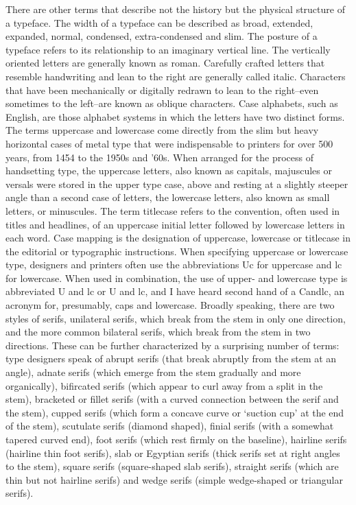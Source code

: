 \documentclass[12pt,a4paper,twocolumn]{book} %
\begin{document}
There are other terms that describe not the history but the physical structure of a typeface. The width of a typeface can be described as broad, extended, expanded, normal, condensed, extra-condensed and slim. The posture of a typeface refers to its relationship to an imaginary vertical line. The vertically oriented letters are generally known as roman. Carefully crafted letters that resemble handwriting and lean to the right are generally called italic. Characters that have been mechanically or digitally redrawn to lean to the right–even sometimes to the left–are known as oblique characters.
Case alphabets, such as English, are those alphabet systems in which the letters have two distinct forms. The terms uppercase and lowercase come directly from the slim but heavy horizontal cases of metal type that were indispensable to printers for over 500 years, from 1454 to the 1950s and ’60s. When arranged for the process of handsetting type, the uppercase letters, also known as capitals, majuscules or versals were stored in the upper type case, above and resting at a slightly steeper angle than a second case of letters, the lowercase letters, also known as small letters, or minuscules. The term titlecase refers to the convention, often used in titles and headlines, of an uppercase initial letter followed by lowercase letters in each word.
Case mapping is the designation of uppercase, lowercase or titlecase in the editorial or typographic instructions. When specifying uppercase or lowercase type, designers and printers often use the abbreviations Uc for uppercase and lc for lowercase. When used in combination, the use of upper- and lowercase type is abbreviated U and lc or U and lc, and I have heard second hand of a Candlc, an acronym for, presumably, caps and lowercase.
Broadly speaking, there are two styles of serifs, unilateral serifs, which break from the stem in only one direction, and the more common bilateral serifs, which break from the stem in two directions. These can be further characterized by a surprising number of terms: type designers speak of abrupt serifs (that break abruptly from the stem at an angle), adnate serifs (which emerge from the stem gradually and more organically), bifircated serifs (which appear to curl away from a split in the stem), bracketed or fillet serifs (with a curved connection between the serif and the stem), cupped serifs (which form a concave curve or ‘suction cup’ at the end of the stem), scutulate serifs (diamond shaped), finial serifs (with a somewhat tapered curved end), foot serifs (which rest firmly on the baseline), hairline serifs (hairline thin foot serifs), slab or Egyptian serifs (thick serifs set at right angles to the stem), square serifs (square-shaped slab serifs), straight serifs (which are thin but not hairline serifs) and wedge serifs (simple wedge-shaped or triangular serifs).
\end{document}

